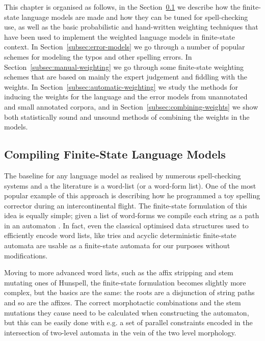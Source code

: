 \documentclass[a4paper,12pt]{article}
\begin{document}
This chapter is organised as follows, in the
Section~\ref{subsec:language-models} we describe how the finite-state language
models are made and how they can be tuned for spell-checking use, as well as
the basic probabilistic and hand-written weighting techniques that have been
used to implement the weighted language models in finite-state context. In
Section~\ref{subsec:error-models} we go through a number of popular schemes for
modeling the typos and other spelling errors.  In
Section~\ref{subsec:manual-weighting} we go through some finite-state weighting
schemes that are based on mainly the expert judgement and fiddling with the
weights.  In Section~\ref{subsec:automatic-weighting} we study the methods for
inducing the weights for the language and the error models from unannotated and
small annotated corpora, and in Section~\ref{subsec:combining-weights} we show
both statistically sound and unsound methods of combining the weights in the
models.

\subsection{Compiling Finite-State Language Models}
\label{subsec:language-models}

The baseline for any language model as realised by numerous
spell-checking systems and a the literature is a word-list (or a word-form
list). One of the most popular example of this approach
is \cite[]{norvig/2010} describing how he programmed a toy spelling corrector
during an intercontinental flight. The finite-state formulation of
this idea is equally simple; given a list of word-forms we compile each string
as a path in an automaton \cite[]{pirinen2012effects}. In fact, even the
classical optimised data structures used to efficiently encode word lists, like
tries and acyclic deterministic finite-state automata are usable as
a finite-state automata for our purposes without modifications.

Moving to more advanced word lists, such as the affix stripping and stem
mutating ones of Hunspell, the finite-state formulation becomes slightly more
complex, but the basics are the same: the roots are a disjunction of string
paths and so are the affixes. The correct morphotactic combinations and the
stem mutations they cause need to be calculated when constructing the
automaton, but this can be easily done with e.g. a set of parallel constraints
encoded in the intersection of two-level automata \cite[]{pirinen2010creating}
in the vein of the two level morphology.
\end{document}
